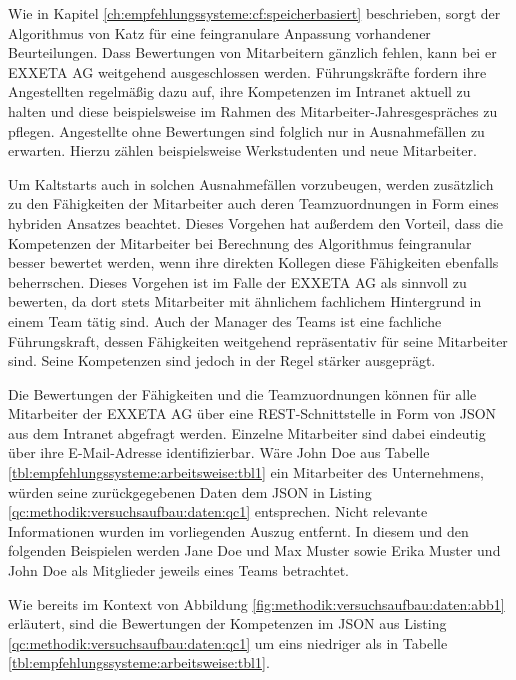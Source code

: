 Wie in Kapitel \ref{ch:empfehlungssysteme:cf:speicherbasiert} beschrieben, sorgt der Algorithmus von Katz für eine feingranulare Anpassung vorhandener Beurteilungen. Dass Bewertungen von Mitarbeitern gänzlich fehlen, kann bei er EXXETA AG weitgehend ausgeschlossen werden. Führungskräfte fordern ihre Angestellten regelmäßig dazu auf, ihre Kompetenzen im Intranet aktuell zu halten und diese beispielsweise im Rahmen des Mitarbeiter-Jahresgespräches zu pflegen. Angestellte ohne Bewertungen sind folglich nur in Ausnahmefällen zu erwarten. Hierzu zählen beispielsweise Werkstudenten und neue Mitarbeiter.

Um Kaltstarts auch in solchen Ausnahmefällen vorzubeugen, werden zusätzlich zu den Fähigkeiten der Mitarbeiter auch deren Teamzuordnungen in Form eines hybriden Ansatzes beachtet. Dieses Vorgehen hat außerdem den Vorteil, dass die Kompetenzen der Mitarbeiter bei Berechnung des Algorithmus feingranular besser bewertet werden, wenn ihre direkten Kollegen diese Fähigkeiten ebenfalls beherrschen. Dieses Vorgehen ist im Falle der EXXETA AG als sinnvoll zu bewerten, da dort stets Mitarbeiter mit ähnlichem fachlichem Hintergrund in einem Team tätig sind. Auch der Manager des Teams ist eine fachliche Führungskraft, dessen Fähigkeiten weitgehend repräsentativ für seine Mitarbeiter sind. Seine Kompetenzen sind jedoch in der Regel stärker ausgeprägt.

Die Bewertungen der Fähigkeiten und die Teamzuordnungen können für alle Mitarbeiter der EXXETA AG über eine REST-Schnittstelle in Form von JSON aus dem Intranet abgefragt werden. Einzelne Mitarbeiter sind dabei eindeutig über ihre E-Mail-Adresse identifizierbar. Wäre John Doe aus Tabelle \ref{tbl:empfehlungssysteme:arbeitsweise:tbl1} ein Mitarbeiter des Unternehmens, würden seine zurückgegebenen Daten dem JSON in Listing \ref{qc:methodik:versuchsaufbau:daten:qc1} entsprechen. Nicht relevante Informationen wurden im vorliegenden Auszug entfernt. In diesem und den folgenden Beispielen werden Jane Doe und Max Muster sowie Erika Muster und John Doe als Mitglieder jeweils eines Teams betrachtet. 



Wie bereits im Kontext von Abbildung \ref{fig:methodik:versuchsaufbau:daten:abb1} erläutert, sind die Bewertungen der Kompetenzen im JSON aus Listing \ref{qc:methodik:versuchsaufbau:daten:qc1} um eins niedriger als in Tabelle \ref{tbl:empfehlungssysteme:arbeitsweise:tbl1}.

